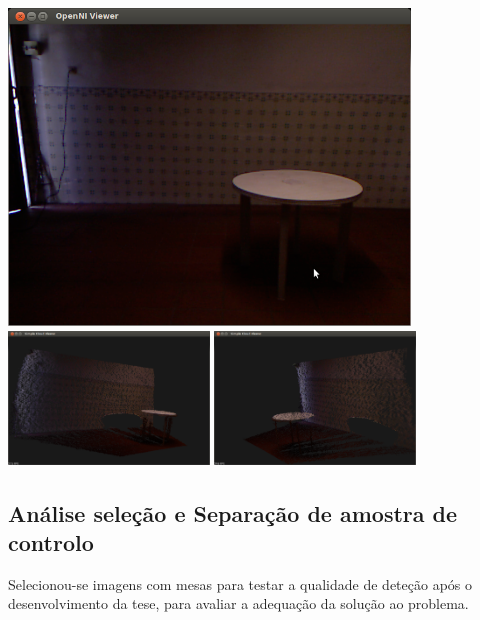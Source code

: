 \begin{center}
	\includegraphics[width=0.8\textwidth]{figures/experiencia/exp4.png}\\
	\includegraphics[width=0.4\textwidth]{figures/exemplo_captura_perspectiva1.png}
	\includegraphics[width=0.4\textwidth]{figures/exemplo_captura_perspectiva2.png}

	\label{fig:exemplo_captura}
\end{center}

\subsection{Análise seleção e Separação de amostra de controlo}

Selecionou-se imagens com mesas para testar a qualidade de deteção após o desenvolvimento da tese, para avaliar a adequação da solução ao problema.


